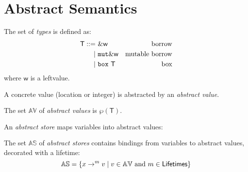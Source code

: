 \section{Abstract Semantics}\label{sec:abstract_semantics}

\begin{definition}[Types]
  The set of \emph{types} is defined as:
  \begin{align*}
    \mathsf{T} ::= &\ \&\mathsf{w} & \text{borrow}\\
    | &\ \mathtt{mut}\&\mathsf{w} & \text{mutable borrow}\\
    | &\ \mathtt{box}\ \mathsf{T} & \text{box}
  \end{align*}
  where $\mathsf{w}$ is a leftvalue.
\end{definition}

A concrete value (location or integer) is abstracted by an
\emph{abstract value}.

\begin{definition}
  The set $\mathbb{AV}$ of \emph{abstract values} is $\wp(\mathsf{T})$.
\end{definition}

An \emph{abstract store} maps variables into abstract values:

\begin{definition}
  The set $\mathbb{AS}$ of \emph{abstract stores} contains bindings
  from variables to abstract values, decorated with a lifetime:
  \[
  \mathbb{AS}=\{x\to^m v\mid v\in\mathbb{AV}\text{ and }m\in\mathsf{Lifetimes}\}
  \]
\end{definition}
